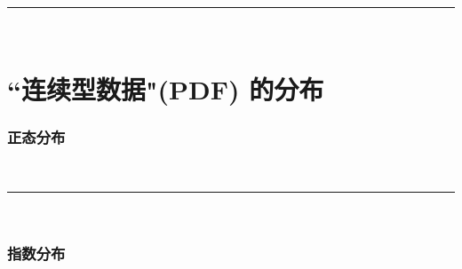 \documentclass[UTF8]{ctexart}
\begin{document}
	
	
	
	
	
	
	~\\
	\hrule
	~\\
	
	\part{``连续型数据"(PDF) 的分布}
	
	\section{正态分布}
	
	
	
	~\\
	\hrule
	~\\
	
	\section{指数分布}
	
	
	
	
	
\end{document}
